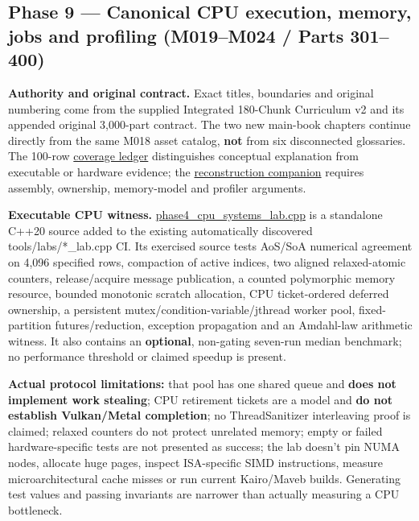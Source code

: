 \subsection{Phase 9 --- Canonical CPU execution, memory, jobs and profiling (M019--M024 / Parts 301--400)}\label{appendix-a103e7846d21-phase-9-canonical-cpu-execution-memory-jobs-and-profiling-m019m024-parts-301400}

\textbf{Authority and original contract.} Exact titles, boundaries and original numbering come from the supplied Integrated 180-Chunk Curriculum v2 and its appended original 3,000-part contract. The two new main-book chapters continue directly from the same M018 asset catalog, \textbf{not} from six disconnected glossaries. The 100-row \hyperref[appendix-fd090d982a15-phase-4-cpu-architecture-and-measured-execution-parts-301400]{coverage ledger} distinguishes conceptual explanation from executable or hardware evidence; the \hyperref[appendix-2587680a4fe3]{reconstruction companion} requires assembly, ownership, memory-model and profiler arguments.

\textbf{Executable CPU witness.} \hyperref[source-file-0060a91bd24dd25d6c14e679]{phase4\_cpu\_systems\_lab.cpp} is a standalone C++20 source added to the existing automatically discovered tools/labs/*\_lab.cpp CI. Its exercised source tests AoS/SoA numerical agreement on 4,096 specified rows, compaction of active indices, two aligned relaxed-atomic counters, release/acquire message publication, a counted polymorphic memory resource, bounded monotonic scratch allocation, CPU ticket-ordered deferred ownership, a persistent mutex/condition-variable/jthread worker pool, fixed-partition futures/reduction, exception propagation and an Amdahl-law arithmetic witness. It also contains an \textbf{optional}, non-gating seven-run median benchmark; no performance threshold or claimed speedup is present.

\textbf{Actual protocol limitations:} that pool has one shared queue and \textbf{does not implement work stealing}; CPU retirement tickets are a model and \textbf{do not establish Vulkan/Metal completion}; no ThreadSanitizer interleaving proof is claimed; relaxed counters do not protect unrelated memory; empty or failed hardware-specific tests are not presented as success; the lab doesn't pin NUMA nodes, allocate huge pages, inspect ISA-specific SIMD instructions, measure microarchitectural cache misses or run current Kairo/Maveb builds. Generating test values and passing invariants are narrower than actually measuring a CPU bottleneck.

